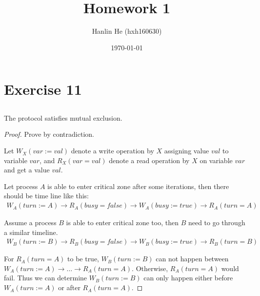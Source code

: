 \documentclass{article}
\title{Homework 1}
\author{Hanlin He (hxh160630)}
\date{\today}
\begin{document}
\maketitle

\section{Exercise 11}
\subsection{}\label{11.1}
The protocol satisfies mutual exclusion.

\begin{proof}
Prove by contradiction.

Let $W_X(var := val)$ denote a write operation by $X$ assigning value $val$ to
variable $var$, and $R_X(var = val)$ denote a read operation by $X$ on variable
$var$ and get a value $val$.

Let process $A$ is able to enter critical zone after some iterations, then there should
be time line like this:
\begin{align*}
    W_A(turn := A) \rightarrow R_A(busy = false) \rightarrow W_A(busy := true)
    \rightarrow R_A(turn = A)
\end{align*}

Assume a process $B$ is able to enter critical zone too, then $B$ need to go
through a similar timeline.
\begin{align*}
    W_B(turn := B) \rightarrow R_B(busy = false) \rightarrow W_B(busy := true)
    \rightarrow R_B(turn = B)
\end{align*}

For $R_A(turn=A)$ to be true, $W_B(turn:=B)$ can not happen between
$W_A(turn:=A)\rightarrow\ldots\rightarrow R_A(turn=A)$. Otherwise,
$R_A(turn=A)$ would fail. Thus we can determine $W_B(turn:=B)$ can only
happen either before $W_A(turn:=A)$ or after $R_A(turn=A)$.


\end{proof}
\end{document}
